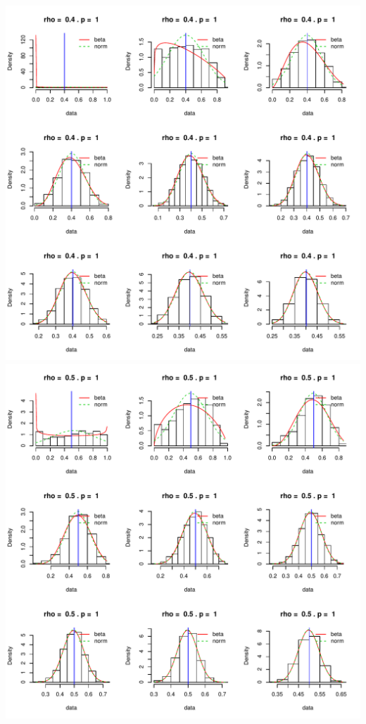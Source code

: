 \documentclass[]{article}
\begin{document}
\includegraphics{2016_w09_files/figure-latex/unnamed-chunk-13-5.pdf}
\includegraphics{2016_w09_files/figure-latex/unnamed-chunk-13-6.pdf}
\end{document}
